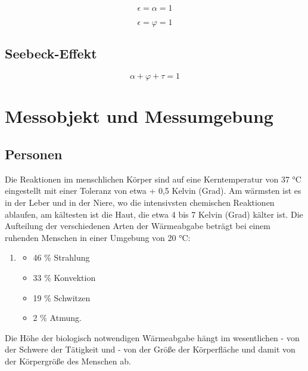 \begin{equation}
\label{eq4}
\epsilon = \alpha  = 1
\end{equation}

\begin{equation}
\label{eq4}
\epsilon = \varphi  = 1
\end{equation}



\subsection{Seebeck-Effekt}

\begin{equation}
\label{eq4}
\alpha + \varphi + \tau  = 1
\end{equation}



\section{Messobjekt und Messumgebung}


\subsection{Personen}
Die Reaktionen im menschlichen Körper sind auf eine Kerntemperatur von 37 °C eingestellt
mit einer Toleranz von etwa + 0,5 Kelvin (Grad). Am wärmsten ist es in der Leber und in der
Niere, wo die intensivsten chemischen Reaktionen ablaufen, am kältesten ist die Haut, die
etwa 4 bis 7 Kelvin (Grad) kälter ist.
Die Aufteilung der verschiedenen Arten der Wärmeabgabe beträgt bei einem ruhenden
Menschen in einer Umgebung von 20 °C:

\begin{enumerate}
\item 
\begin{itemize}
	\item  46 \% Strahlung
	\item  33 \% Konvektion
	\item  19 \% Schwitzen
	\item   2 \% Atmung.
\end{itemize}
\end{enumerate}	


Die Höhe der biologisch notwendigen Wärmeabgabe hängt im wesentlichen
- von der Schwere der Tätigkeit und
- von der Größe der Körperfläche und damit von der Körpergröße des Menschen ab.


